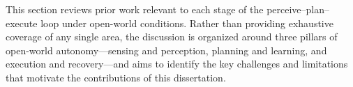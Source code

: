 This section reviews prior work relevant to each stage of the perceive--plan--execute loop under open-world conditions. Rather than providing exhaustive coverage of any single area, the discussion is organized around three pillars of open-world autonomy---sensing and perception, planning and learning, and execution and recovery---and aims to identify the key challenges and limitations that motivate the contributions of this dissertation.




